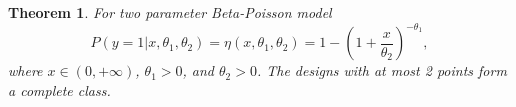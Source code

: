 \documentclass[12pt]{amsart}
\newtheorem{theorem}{Theorem}[section]
\theoremstyle{definition}
\theoremstyle{remark}
\numberwithin{equation}{section}
\begin{document}



\begin{theorem}\label{beta}
For two parameter Beta-Poisson model \[
P(y=1|x,\theta_1,\theta_2) = \eta(x,\theta_1,\theta_2)= 1-(1+\frac{x}{\theta_2})^{-\theta_1},
\] where $x\in (0,+\infty)$, $\theta_1>0$, and $\theta_2>0$.  The designs with at most 2 points form a complete class.
\end{theorem}
\end{document}
